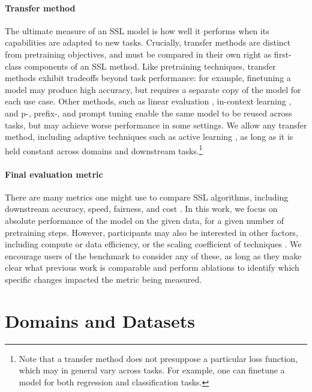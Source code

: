 \documentclass{article}
\begin{document}
\paragraph{Transfer method} The ultimate measure of an SSL model is how well it performs when its capabilities are adapted to new tasks. Crucially, transfer methods are distinct from pretraining objectives, and must be compared in their own right as first-class components of an SSL method. Like pretraining techniques, transfer methods exhibit tradeoffs beyond task performance: for example, finetuning a model may produce high accuracy, but requires a separate copy of the model for each use case. Other methods, such as linear evaluation \citep{Zhang2016ColorfulIC}, in-context learning \citep{Brown2020LanguageMA}, and p-, prefix-, and prompt tuning \citep{Liu2021GPTUT, Lester2021ThePO, Li2021PrefixTuningOC} enable the same model to be reused across tasks, but may achieve worse performance in some settings. We allow any transfer method, including adaptive techniques such as active learning \citep{tamkin2022active}, as long as it is held constant across domains and downstream tasks.\footnote{Note that a transfer method does not presuppose a particular loss function, which may in general vary across tasks. For example, one can finetune a model for both regression and classification tasks.}
\paragraph{Final evaluation metric} There are many metrics one might use to compare SSL algorithms, including downstream accuracy, speed, fairness, and cost \citep{Ethayarajh2020UtilityII}. In this work, we focus on absolute performance of the model on the given data, for a given number of pretraining steps. However, participants may also be interested in other factors, including compute or data efficiency, or the scaling coefficient of techniques \citep{Kaplan2020ScalingLF, Henighan2020ScalingLF}. We encourage users of the benchmark to consider any of these, as long as they make clear what previous work is comparable and perform ablations to identify which specific changes impacted the metric being measured.





\section{Domains and Datasets}
\label{sec:domains}
\end{document}
